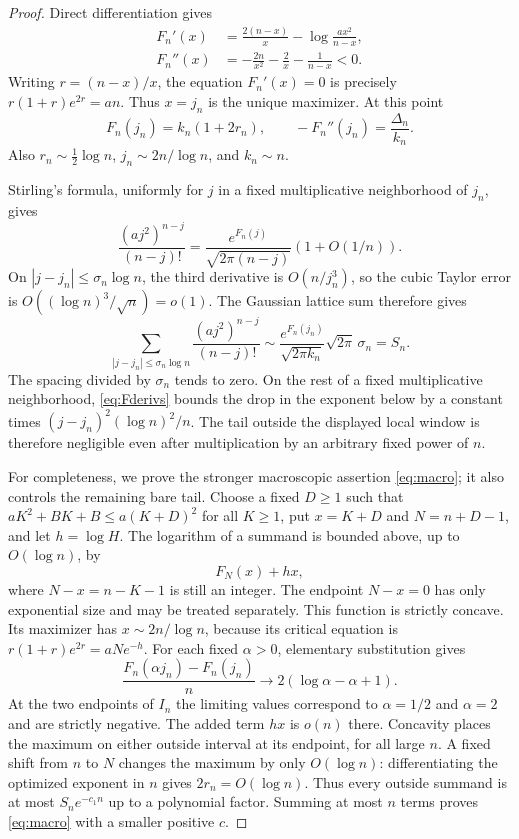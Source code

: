 \documentclass[11pt,a4paper]{article}
\numberwithin{equation}{section}
\theoremstyle{definition}
\theoremstyle{remark}
\begin{document}
\begin{proof}
Direct differentiation gives
\begin{align}
 F_n'(x)&=\frac{2(n-x)}x-\log\frac{a x^2}{n-x},\\
 F_n''(x)&=-\frac{2n}{x^2}-\frac2x-\frac1{n-x}<0.
 \label{eq:Fderivs}
\end{align}
Writing $r=(n-x)/x$, the equation $F_n'(x)=0$ is precisely
$r(1+r)e^{2r}=an$. Thus $x=j_n$ is the unique maximizer. At this point
\begin{equation}
 F_n(j_n)=k_n(1+2r_n),\qquad
 -F_n''(j_n)=\frac{\Delta_n}{k_n}.
 \label{eq:Fatsaddle}
\end{equation}
Also $r_n\sim\tfrac12\log n$, $j_n\sim2n/\log n$, and $k_n\sim n$.

Stirling's formula, uniformly for $j$ in a fixed multiplicative
neighborhood of $j_n$, gives
\[
 \frac{(a j^2)^{n-j}}{(n-j)!}
 =\frac{e^{F_n(j)}}{\sqrt{2\pi(n-j)}}(1+O(1/n)).
\]
On $|j-j_n|\le\sigma_n\log n$, the third derivative is
$O(n/j_n^3)$, so the cubic Taylor error is
$O((\log n)^3/\sqrt n)=o(1)$. The Gaussian lattice sum therefore gives
\[
 \sum_{|j-j_n|\le\sigma_n\log n}
 \frac{(a j^2)^{n-j}}{(n-j)!}
 \sim\frac{e^{F_n(j_n)}}{\sqrt{2\pi k_n}}
        \sqrt{2\pi}\,\sigma_n=S_n.
\]
The spacing divided by $\sigma_n$ tends to zero. On the rest of a fixed
multiplicative neighborhood, \eqref{eq:Fderivs} bounds the drop in the
exponent below by a constant times
$(j-j_n)^2(\log n)^2/n$. The tail outside the displayed local window is
therefore negligible even after multiplication by an arbitrary fixed
power of $n$.

For completeness, we prove the stronger macroscopic assertion
\eqref{eq:macro}; it also controls the remaining bare tail. Choose a
fixed $D\ge1$ such that
$aK^2+BK+B\le a(K+D)^2$ for all $K\ge1$, put
$x=K+D$ and $N=n+D-1$, and let $h=\log H$.
The logarithm of a summand is bounded above, up to $O(\log n)$, by
\[
 F_N(x)+hx,
\]
where $N-x=n-K-1$ is still an integer. The endpoint $N-x=0$ has only
exponential size and may be treated separately. This function is strictly
concave. Its maximizer has $x\sim2n/\log n$, because its critical equation
is $r(1+r)e^{2r}=aN e^{-h}$.
For each fixed $\alpha>0$, elementary substitution gives
\begin{equation}
 \frac{F_n(\alpha j_n)-F_n(j_n)}n
 \longrightarrow 2(\log\alpha-\alpha+1).
 \label{eq:macro-rate}
\end{equation}
At the two endpoints of $I_n$ the limiting values correspond to
$\alpha=1/2$ and $\alpha=2$ and are strictly negative. The added term
$hx$ is $o(n)$ there. Concavity places the maximum on either outside
interval at its endpoint, for all large $n$. A fixed shift from $n$ to
$N$ changes the maximum by only $O(\log n)$: differentiating the optimized
exponent in $n$ gives $2r_n=O(\log n)$. Thus every outside summand is at
most $S_n e^{-c_1n}$ up to a polynomial factor. Summing at most $n$ terms
proves \eqref{eq:macro} with a smaller positive $c$.
\end{proof}
\end{document}
